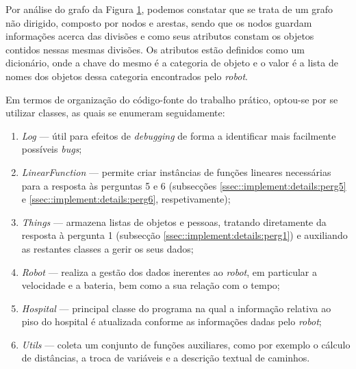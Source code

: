 \begin{figure}[!htb]
	\centering
	\caption{}{}
	\label{fig::grafo_floor}
\end{figure}

Por análise do grafo da Figura \ref{fig::grafo_floor}, podemos constatar que se trata de um grafo não dirigido, composto por nodos e arestas, sendo que os nodos guardam informações acerca das divisões e como seus atributos constam os objetos contidos nessas mesmas divisões. Os atributos estão definidos como um dicionário, onde a chave do mesmo é a categoria de objeto e o valor é a lista de nomes dos objetos dessa categoria encontrados pelo \emph{robot}.

\begin{figure}[!htb]
	\centering
	\caption{}{}
	\label{fig::grafo_map}
\end{figure}



Em termos de organização do código-fonte do trabalho prático, optou-se por se utilizar classes, as quais se enumeram seguidamente:

\begin{enumerate}
	\item \emph{Log} --- útil para efeitos de \emph{debugging} de forma a identificar mais facilmente possíveis \emph{bugs};
	
	\item \emph{LinearFunction} --- permite criar instâncias de funções lineares necessárias para a resposta às perguntas 5 e 6 (subsecções \ref{ssec::implement:details:perg5} e \ref{ssec::implement:details:perg6}, respetivamente);
	
	\item \emph{Things} --- armazena listas de objetos e pessoas, tratando diretamente da resposta à pergunta 1 (subsecção \ref{ssec::implement:details:perg1}) e auxiliando as restantes classes a gerir os seus dados;
	
	\item \emph{Robot} --- realiza a gestão dos dados inerentes ao \textit{robot}, em particular a velocidade e a bateria, bem como a sua relação com o tempo;
	
	\item \emph{Hospital} --- principal classe do programa na qual a informação relativa ao piso do hospital é atualizada conforme as informações dadas pelo \emph{robot};
	
	\item \emph{Utils} --- coleta um conjunto de funções auxiliares, como por exemplo o cálculo de distâncias, a troca de variáveis e a descrição textual de caminhos.
\end{enumerate}


